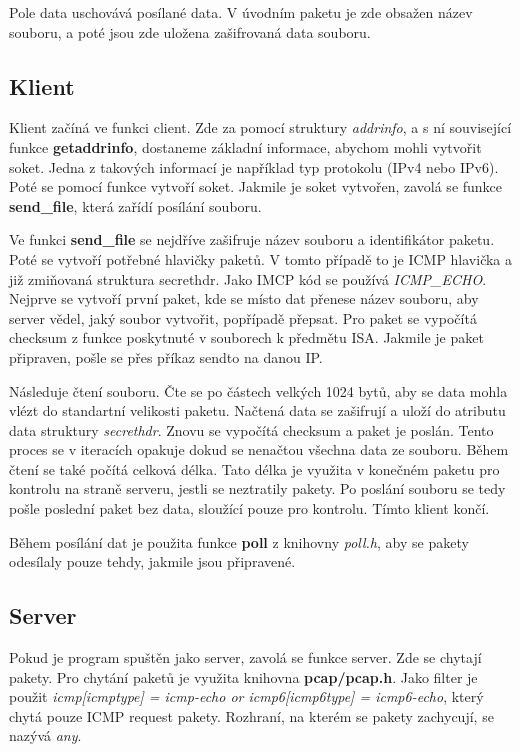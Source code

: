 \documentclass[11pt, a4paper]{article}
\begin{document}
Pole data uschovává posílané data. V úvodním paketu je zde obsažen název souboru, a poté jsou zde uložena zašifrovaná data souboru.

\subsection{Klient}
Klient začíná ve funkci client. Zde za pomocí struktury \emph{addrinfo}, a s ní související funkce \textbf{getaddrinfo}, dostaneme základní informace, abychom mohli vytvořit soket. Jedna z takových informací je například typ protokolu (IPv4 nebo IPv6). Poté se pomocí funkce vytvoří soket. Jakmile je soket vytvořen, zavolá se funkce \textbf{send\_file}, která zařídí posílání souboru.

Ve funkci \textbf{send\_file} se nejdříve zašifruje název souboru a identifikátor paketu. Poté se vytvoří potřebné hlavičky paketů. V tomto případě to je ICMP hlavička a již zmiňovaná struktura secrethdr.
Jako IMCP kód se používá \emph{ICMP\_ECHO}. Nejprve se vytvoří první paket, kde se místo dat přenese název souboru, aby server vědel, jaký soubor vytvořit, popřípadě přepsat. Pro paket se vypočítá checksum z funkce poskytnuté v souborech k předmětu ISA. Jakmile je paket připraven, pošle se přes příkaz sendto na danou IP.

Následuje čtení souboru. Čte se po částech velkých 1024 bytů, aby se data mohla vlézt do standartní velikosti paketu. Načtená data se zašifrují a uloží do atributu data struktury \emph{secrethdr}. Znovu se vypočítá checksum a paket je poslán. Tento proces se v iteracích opakuje dokud se nenačtou všechna data ze souboru. Během čtení se také počítá celková délka. Tato délka je využita v konečném paketu pro kontrolu na straně serveru, jestli se neztratily pakety. Po poslání souboru se tedy pošle poslední paket bez data, sloužící pouze pro kontrolu. Tímto klient končí.

Během posílání dat je použita funkce \textbf{poll} z knihovny \emph{poll.h}, aby se pakety odesílaly pouze tehdy, jakmile jsou připravené.
\subsection{Server}

Pokud je program spuštěn jako server, zavolá se funkce server. Zde se chytají pakety. Pro chytání paketů je využita knihovna \textbf{pcap/pcap.h}. Jako filter je použit \emph{icmp[icmptype] = icmp-echo or icmp6[icmp6type] = icmp6-echo}, který chytá pouze ICMP request pakety. Rozhraní, na kterém se pakety zachycují, se nazývá \emph{any}.
\end{document}
